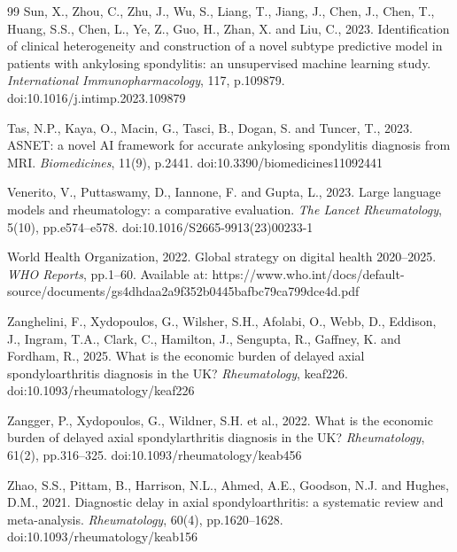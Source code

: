 \documentclass[12pt, a4paper]{article}
\renewcommand{\arraystretch}{0.9}  %
\renewcommand{\arraystretch}{1.0}
\begin{document}
\begin{thebibliography}{99}
Sun, X., Zhou, C., Zhu, J., Wu, S., Liang, T., Jiang, J., Chen, J., Chen, T., Huang, S.S., Chen, L., Ye, Z., Guo, H., Zhan, X. and Liu, C., 2023. Identification of clinical heterogeneity and construction of a novel subtype predictive model in patients with ankylosing spondylitis: an unsupervised machine learning study. \textit{International Immunopharmacology}, 117, p.109879. doi:10.1016/j.intimp.2023.109879

Tas, N.P., Kaya, O., Macin, G., Tasci, B., Dogan, S. and Tuncer, T., 2023. ASNET: a novel AI framework for accurate ankylosing spondylitis diagnosis from MRI. \textit{Biomedicines}, 11(9), p.2441. doi:10.3390/biomedicines11092441

Venerito, V., Puttaswamy, D., Iannone, F. and Gupta, L., 2023. Large language models and rheumatology: a comparative evaluation. \textit{The Lancet Rheumatology}, 5(10), pp.e574--e578. doi:10.1016/S2665-9913(23)00233-1

World Health Organization, 2022. Global strategy on digital health 2020--2025. \textit{WHO Reports}, pp.1--60. Available at: https://www.who.int/docs/default-source/documents/gs4dhdaa2a9f352b0445bafbc79ca799dce4d.pdf

Zanghelini, F., Xydopoulos, G., Wilsher, S.H., Afolabi, O., Webb, D., Eddison, J., Ingram, T.A., Clark, C., Hamilton, J., Sengupta, R., Gaffney, K. and Fordham, R., 2025. What is the economic burden of delayed axial spondyloarthritis diagnosis in the UK? \textit{Rheumatology}, keaf226. doi:10.1093/rheumatology/keaf226

Zangger, P., Xydopoulos, G., Wildner, S.H. et al., 2022. What is the economic burden of delayed axial spondylarthritis diagnosis in the UK? \textit{Rheumatology}, 61(2), pp.316--325. doi:10.1093/rheumatology/keab456

Zhao, S.S., Pittam, B., Harrison, N.L., Ahmed, A.E., Goodson, N.J. and Hughes, D.M., 2021. Diagnostic delay in axial spondyloarthritis: a systematic review and meta-analysis. \textit{Rheumatology}, 60(4), pp.1620--1628. doi:10.1093/rheumatology/keab156

\end{thebibliography}






\renewcommand{\arraystretch}{1.2} %

\appendix
\renewcommand{\thesection}{\Alph{section}}
\end{document}
